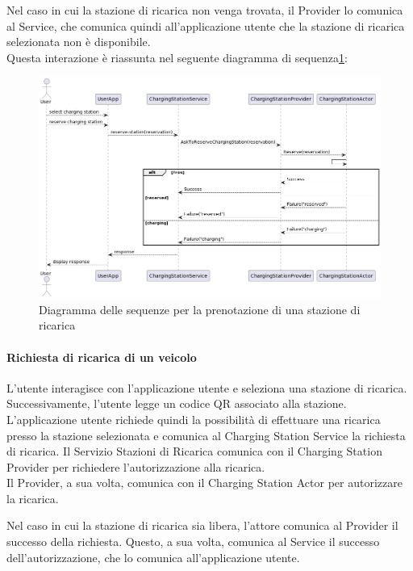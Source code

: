 Nel caso in cui la stazione di ricarica non venga trovata, il Provider lo comunica al Service,
che comunica quindi all'applicazione utente che la stazione di ricarica selezionata non è disponibile.\\

Questa interazione è riassunta nel seguente diagramma di sequenza\ref{fig:reserve-station}:

\begin{figure}[htbp]
    \centering
    \includegraphics[width=\textwidth]{images/reserve-station.png}
    \caption{Diagramma delle sequenze per la prenotazione di una stazione di ricarica}
    \label{fig:reserve-station}
\end{figure}

\paragraph{Richiesta di ricarica di un veicolo}
L'utente interagisce con l'applicazione utente  e seleziona una stazione di ricarica.
Successivamente, l'utente legge un codice QR associato alla stazione.\\

L'applicazione utente richiede quindi la possibilità di effettuare una ricarica presso
la stazione selezionata e comunica al Charging Station Service la richiesta di ricarica.
Il Servizio Stazioni di Ricarica comunica con il Charging Station Provider per richiedere
l'autorizzazione alla ricarica.\\

Il Provider, a sua volta, comunica con il Charging Station Actor per autorizzare la ricarica.

Nel caso in cui la stazione di ricarica sia libera, l'attore comunica al Provider il successo
della richiesta. Questo, a sua volta, comunica al Service il successo dell'autorizzazione,
che lo comunica all'applicazione utente.\\

